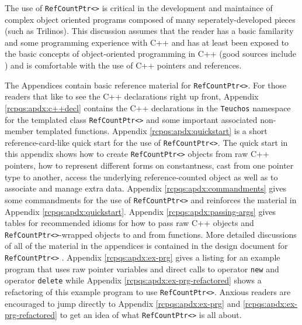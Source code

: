 \documentclass[pdf,ps2pdf,11pt]{SANDreport}
\begin{document}
The use of {}\texttt{Ref\-Count\-Ptr<>} is critical in the development
and maintaince of complex object oriented programs composed of many
seperately-developed pieces (such as Trilinos).  This discussion
assumes that the reader has a basic familarity and some programming
experience with C++ and has at least been exposed to the basic
concepts of object-oriented programming in C++ (good sources include
{}\cite{ref:stroustrup_2000}) and is comfortable with the use of C++
pointers and references.

The Appendices contain basic reference material for
{}\texttt{Ref\-Count\-Ptr<>}.  For those readers that like to see the
C++ declarations right up front, Appendix {}\ref{rcpqs:apdx:c++decl}
contains the C++ declarations in the {}\texttt{Teuchos} namespace for
the templated class {}\texttt{Ref\-Count\-Ptr<>} and some important
associated non-member templated functions.  Appendix
{}\ref{rcpqs:apdx:quickstart} is a short reference-card-like quick
start for the use of {}\texttt{Ref\-Count\-Ptr<>}.  The quick start in
this appendix shows how to create {}\texttt{Ref\-Count\-Ptr<>} objects
from raw C++ pointers, how to represent different forms on
constantness, cast from one pointer type to another, access the
underlying reference-counted object as well as to associate and manage
extra data.  Appendix {}\ref{rcpqs:apdx:commandments} gives some
commandments for the use of {}\texttt{Ref\-Count\-Ptr<>} and
reinforces the material in Appendix {}\ref{rcpqs:apdx:quickstart}.
Appendix {}\ref{rcpqs:apdx:passing-args} gives tables for recommended
idioms for how to pass raw C++ objects and
{}\texttt{Ref\-Count\-Ptr<>}-wrapped objects to and from functions.
More detailed discussions of all of the material in the appendices is
contained in the design document for {}\texttt{Ref\-Count\-Ptr<>}
{}\cite{ref:RefCountPtr}.  Appendix {}\ref{rcpqs:apdx:ex-prg} gives a
listing for an example program that uses raw pointer variables and
direct calls to operator {}\texttt{new} and operator {}\texttt{delete}
while Appendix {}\ref{rcpqs:apdx:ex-prg-refactored} shows a
refactoring of this example program to use
{}\texttt{Ref\-Count\-Ptr<>}.  Anxious readers are encouraged to jump
directly to Appendix {}\ref{rcpqs:apdx:ex-prg} and
{}\ref{rcpqs:apdx:ex-prg-refactored} to get an idea of what
{}\texttt{Ref\-Count\-Ptr<>} is all about.
\end{document}
